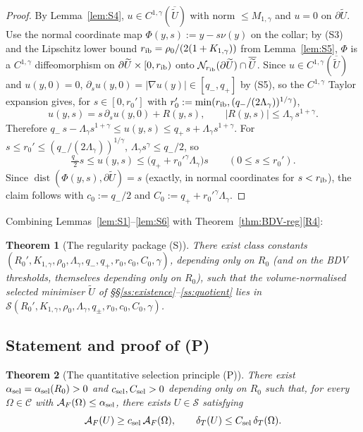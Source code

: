 \documentclass[11pt]{amsart}
\newtheorem{theorem}{Theorem}[section]
\newcommand{\dT}{\delta_T}
\newcommand{\AF}{\mathcal A_F}
\newcommand{\Sclass}{\mathcal S}
\newcommand{\wt}{\widetilde}
\DeclareMathOperator{\dist}{dist}
\begin{document}
\begin{proof}
By Lemma~\ref{lem:S4}, $u\in C^{1,\gamma}(\overline{\wt U})$ with
norm $\le M_{1,\gamma}$ and $u=0$ on $\partial\wt U$.  Use the normal
coordinate map $\Phi(y,s):=y-s\nu(y)$ on the collar; by (S3) and the
Lipschitz lower bound $r_{\rm ib}=\rho_0/(2(1+K_{1,\gamma}))$ from
Lemma~\ref{lem:S5}, $\Phi$ is a $C^{1,\gamma}$ diffeomorphism on
$\partial\wt U\times[0,r_{\rm ib})$ onto $\mathcal N_{r_{\rm ib}}
(\partial\wt U)\cap\overline{\wt U}$.  Since
$u\in C^{1,\gamma}(\overline{\wt U})$ and $u(y,0)=0$,
$\partial_s u(y,0)=|\nabla u(y)|\in[q_-,q_+]$ by (S5), so the
$C^{1,\gamma}$ Taylor expansion gives, for $s\in[0,r_0']$ with
$r_0':=\min(r_{\rm ib},(q_-/(2\Lambda_\gamma))^{1/\gamma})$,
\[
   u(y,s)=s\,\partial_s u(y,0)+R(y,s),\qquad
   |R(y,s)|\le\Lambda_\gamma\,s^{1+\gamma}.
\]
Therefore $q_-\,s-\Lambda_\gamma s^{1+\gamma}\le u(y,s)\le q_+\,s+
\Lambda_\gamma s^{1+\gamma}$.  For $s\le r_0'\le(q_-/(2\Lambda_\gamma))
^{1/\gamma}$, $\Lambda_\gamma s^\gamma\le q_-/2$, so
\[
   \tfrac{q_-}{2}s\le u(y,s)\le\bigl(q_++r_0'^\gamma\Lambda_\gamma\bigr)s
   \qquad(0\le s\le r_0').
\]
Since $\dist(\Phi(y,s),\partial\wt U)=s$ (exactly, in normal
coordinates for $s<r_{\rm ib}$), the claim follows with
$c_0:=q_-/2$ and $C_0:=q_++r_0'^\gamma\Lambda_\gamma$.
\end{proof}

Combining Lemmas~\ref{lem:S1}--\ref{lem:S6} with
Theorem~\ref{thm:BDV-reg}\ref{R4}:

\begin{theorem}[The regularity package (S)]\label{thm:S-package}
There exist class constants $(R_0',K_{1,\gamma},\rho_0,\Lambda_\gamma,
q_-,q_+,r_0,c_0,C_0,\gamma)$, depending only on $R_0$ (and on the BDV
thresholds, themselves depending only on $R_0$), such that the
volume-normalised selected minimiser $\wt U$
of \S\S\ref{ss:existence}--\ref{ss:quotient} lies in
$\Sclass(R_0',K_{1,\gamma},\rho_0,\Lambda_\gamma,q_\pm,r_0,c_0,C_0,
\gamma)$.
\end{theorem}

\subsection{Statement and proof of (P)}\label{ss:P-statement}

\begin{theorem}[The quantitative selection principle (P)]
\label{thm:P-package}
There exist \(\alpha_{\rm sel}=\alpha_{\rm sel}(R_0)>0\) and
\(c_{\rm sel},C_{\rm sel}>0\) depending only on \(R_0\) such that, for
every \(\Omega\in\mathcal C\) with \(\AF(\Omega)\le\alpha_{\rm sel}\),
there exists \(U\in\Sclass\) satisfying
\begin{equation}\label{eq:P-conclusion}
   \AF(U)\ge c_{\rm sel}\,\AF(\Omega),
   \qquad
   \dT(U)\le C_{\rm sel}\,\dT(\Omega).
\end{equation}
\end{theorem}
\end{document}

